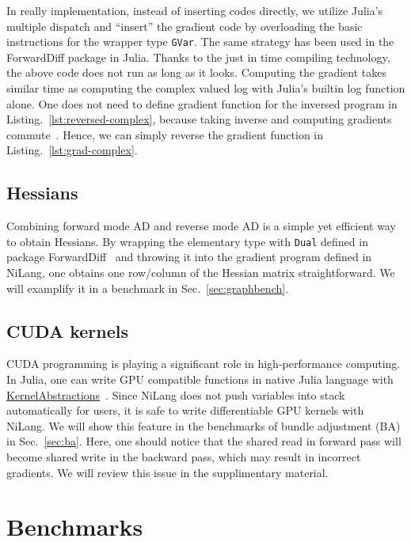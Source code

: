 \documentclass{article}
\newcommand{\<}{\langle}
\renewcommand{\>}{\rangle}
\newcommand{\Lst}[1]{Listing.~\ref{#1}}
\newcommand{\Sec}[1]{Sec.~\ref{#1}}
\theoremstyle{definition}\newtheorem{definition}{\textit{Definition}}
\begin{document}
In really implementation, instead of inserting codes directly, we utilize Julia's multiple dispatch and ``insert'' the gradient code by overloading the basic instructions for the wrapper type \texttt{GVar}.
The same strategy has been used in the ForwardDiff package in Julia.
Thanks to the just in time compiling technology, the above code does not run as long as it looks. Computing the gradient takes similar time as computing the complex valued log with Julia's builtin log function alone.
One does not need to define gradient function for the inversed program in \Lst{lst:reversed-complex}, because taking inverse and computing gradients commute~\cite{Mcinerney2015}. Hence, we can simply reverse the gradient function in \Lst{lst:grad-complex}.

\subsection{Hessians}
Combining forward mode AD and reverse mode AD is a simple yet efficient way to obtain Hessians.
By wrapping the elementary type with \texttt{Dual} defined in package ForwardDiff~\cite{Revels2016} and throwing it into the gradient program defined in NiLang,
one obtains one row/column of the Hessian matrix straightforward.
We will examplify it in a benchmark in \Sec{sec:graphbench}.

\subsection{CUDA kernels}
CUDA programming is playing a significant role in high-performance computing. In Julia, one can write GPU compatible functions in native Julia language with \href{https://github.com/JuliaGPU/KernelAbstractions.jl}{KernelAbstractions}~\cite{Besard2018}.
Since NiLang does not push variables into stack automatically for users, it is safe to write differentiable GPU kernels with NiLang.
We will show this feature in the benchmarks of bundle adjustment (BA) in \Sec{sec:ba}.
Here, one should notice that the shared read in forward pass will become shared write in the backward pass, which may result in incorrect gradients. We will review this issue in the supplimentary material.

\section{Benchmarks}\label{sec:benchmark}
\end{document}
